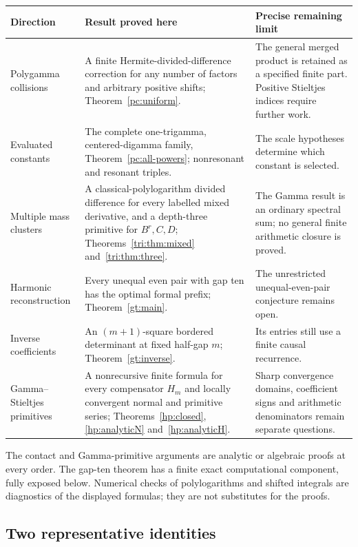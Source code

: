 \begin{longtable}{@{}>{\raggedright\arraybackslash}p{}>{\raggedright\arraybackslash}p{}>{\raggedright\arraybackslash}p{}@{}}
\toprule
Direction & Result proved here & Precise remaining limit\\
\midrule
\endhead
Polygamma collisions & A finite Hermite-divided-difference correction
for any number of factors and arbitrary positive shifts;
Theorem~\ref{pc:uniform}. & The general merged product is retained as a
specified finite part. Positive Stieltjes indices require further work.\\[5pt]
Evaluated constants & The complete one-trigamma, centered-digamma family,
Theorem~\ref{pc:all-powers}; nonresonant and resonant triples. & The scale
hypotheses determine which constant is selected.\\[5pt]
Multiple mass clusters & A classical-polylogarithm divided difference
for every labelled mixed derivative, and a depth-three primitive for
$B^r,C,D$; Theorems~\ref{tri:thm:mixed} and~\ref{tri:thm:three}.
& The Gamma result is an ordinary spectral sum; no general finite
arithmetic closure is proved.\\[5pt]
Harmonic reconstruction & Every unequal even pair with gap ten has the
optimal formal prefix; Theorem~\ref{gt:main}. & The unrestricted
unequal-even-pair conjecture remains open.\\[5pt]
Inverse coefficients & An $(m+1)$-square bordered determinant at fixed
half-gap $m$; Theorem~\ref{gt:inverse}. & Its entries still use a finite
causal recurrence.\\[5pt]
Gamma--Stieltjes primitives & A nonrecursive finite formula for every
compensator $H_m$ and locally convergent normal and primitive series;
Theorems~\ref{hp:closed}, \ref{hp:analyticN} and~\ref{hp:analyticH}.
& Sharp convergence domains, coefficient signs and arithmetic
denominators remain separate questions.\\
\bottomrule
\end{longtable}

The contact and Gamma-primitive arguments are analytic or algebraic
proofs at every order. The gap-ten theorem has a finite exact
computational component, fully exposed below. Numerical checks of
polylogarithms and shifted integrals are diagnostics of the displayed
formulas; they are not substitutes for the proofs.

\subsection{Two representative identities}

